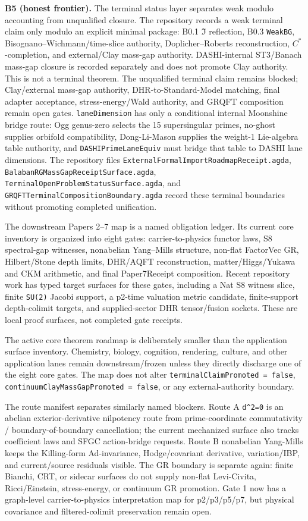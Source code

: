 \documentclass[11pt]{article}
\theoremstyle{definition}
\theoremstyle{plain}
\theoremstyle{remark}
\begin{document}
\textbf{B5 (honest frontier).} The terminal status layer separates weak
modulo accounting from unqualified closure. The repository records a weak
terminal claim only modulo an explicit minimal package: B0.1 \(\Im\)
reflection, B0.3 \texttt{WeakBG}, Bisognano--Wichmann/time-slice authority,
Doplicher--Roberts reconstruction, \(C^*\)-completion, and external/Clay
mass-gap authority. DASHI-internal ST3/Banach mass-gap closure is recorded
separately and does not promote Clay authority. This is not a terminal theorem.
The unqualified terminal claim remains blocked; Clay/external mass-gap
authority, DHR-to-Standard-Model matching, final adapter acceptance,
stress-energy/Wald authority, and GRQFT composition remain open gates.
\texttt{laneDimension} has only a conditional internal Moonshine bridge route:
Ogg genus-zero selects the 15 supersingular primes, no-ghost supplies orbifold
compatibility, Dong-Li-Mason supplies the weight-1 Lie-algebra table authority,
and \texttt{DASHIPrimeLaneEquiv} must bridge that table to DASHI lane
dimensions. The repository files
\texttt{ExternalFormalImportRoadmapReceipt.agda},
\texttt{BalabanRGMassGapReceiptSurface.agda},
\texttt{TerminalOpenProblemStatusSurface.agda}, and
\texttt{GRQFTTerminalCompositionBoundary.agda} record these terminal boundaries
without promoting completed unification.

The downstream Papers 2--7 map is a named obligation ledger. Its current core
inventory is organized into eight gates: carrier-to-physics functor laws, S8
spectral-gap witnesses, nonabelian Yang--Mills structure, non-flat FactorVec
GR, Hilbert/Stone depth limits, DHR/AQFT reconstruction, matter/Higgs/Yukawa
and CKM arithmetic, and final Paper7Receipt composition. Recent repository
work has typed target surfaces for these gates, including a Nat S8 witness
slice, finite \texttt{SU(2)} Jacobi support, a p2-time valuation metric
candidate, finite-support depth-colimit targets, and supplied-sector DHR
tensor/fusion sockets. These are local proof surfaces, not completed gate
receipts.

The active core theorem roadmap is deliberately smaller than the application
surface inventory. Chemistry, biology, cognition, rendering, culture, and other
application lanes remain downstream/frozen unless they directly discharge one
of the eight core gates. The map does not alter
\texttt{terminalClaimPromoted = false},
\texttt{continuumClayMassGapPromoted = false}, or any external-authority
boundary.

The route manifest separates similarly named blockers. Route A
\texttt{d\^{}2=0} is an abelian exterior-derivative nilpotency route from
prime-coordinate commutativity / boundary-of-boundary cancellation; the current
mechanized surface also tracks coefficient laws and SFGC action-bridge
requests. Route B nonabelian Yang-Mills keeps the Killing-form Ad-invariance,
Hodge/covariant derivative, variation/IBP, and current/source residuals
visible. The GR boundary is separate again: finite Bianchi, CRT, or sidecar
surfaces do not supply non-flat Levi-Civita, Ricci/Einstein, stress-energy, or
continuum GR promotion. Gate 1 now has a graph-level carrier-to-physics
interpretation map for p2/p3/p5/p7, but physical covariance and
filtered-colimit preservation remain open.
\end{document}
